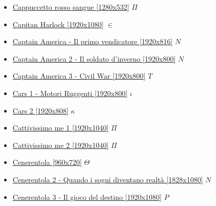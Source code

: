 		\begin{itemize}
			\item \href{https://mega.nz/#!MfB0GSza!A_4MNORyAOetdjhwdnP3vPT0Fj6Z0_Ajcos4wvka5x8} {Cappuccetto rosso sangue [1280x532]}  $\Pi$ \\
			\item \href{https://mega.nz/#!yK5jEKCJ!lJ_yQw2J7HPvvNQRLQJdn9ejVUo9O5Iq1d9aRFATL2A} {Capitan Harlock [1920x1080]}  $\in$ \\ 
			\item \href{https://mega.nz/#!pX50HYSI!QSxIGf5P5JIcTnjQvelrzRoPnqKh6_lwj1Ug7Tssxy4} {Captain America - Il primo vendicatore [1920x816]}  $N$ \\ 
			\item \href{https://mega.nz/#!FexXxCpR!CyM9i_KqW0bWrMIYrSNscP1asT5sEfMhZ57XPsyuvAQ} {Captain America 2 - Il soldato d'inverno [1920x800]}  $N$ \\ 
			\item \href{https://mega.nz/#!9rA0nLhY!wD4PwUTM_0ufZ8U8nVbi9IlPxQ-Ry5BhvoX5FOZ0N28} {Captain America 3 - Civil War [1920x800]}  $T$ \\
			\item \href{https://mega.nz/#!8pIW3Rqb!PT225xfgqJuydYxPQlm6SHMYZFbbFZndbFutCT0cQxs} {Cars 1 - Motori Ruggenti [1920x800]}  $\iota$ \\ 
			\item \href{https://mega.nz/#!rRgw2SbZ!dy9On6D7Wfza8tbfORh-WnViBZiVNF30BwRB0h4ruBc} {Cars 2 [1920x808]}  $\kappa$ \\ 
			\item \href{https://mega.nz/#!0CpjDDJa!h5t8F36ObqPbGPE8_LkagLgoigE3qJ8vL-uzbL3RlNQ} {Cattivissimo me 1 [1920x1040]}  $\Pi$ \\ 
			\item \href{https://mega.nz/#!1S4GUAyA!A8NSYQsxX0tONezYp1mC8wLdg0Z6un7tvYSaU5EH9Sc} {Cattivissimo me 2 [1920x1040]}  $\Pi$ \\ 
			\item \href{https://mega.nz/#!LlJSBaCZ!G3KddhVmr69MXkGcZPw6bqmWRa4-y1H7x841Z1tPr0A} {Cenerentola [960x720]}  $\Theta$ \\
			\item \href{https://mega.nz/#!JSYABTbR!npx_0UxCVKt95OQxc1264ErAPnFBoHPAWL2H0KQrc3c} {Cenerentola 2 - Quando i sogni diventano realtà [1828x1080]}  $N$ \\
			\item \href{https://mega.nz/#!8HgUAZqC!XqU-oYMImuBknniDkeB34mJPEYiCOvgN0oMWg9gH7kg} {Cenerentola 3 - Il gioco del destino [1920x1080]}  $P$ \\

\end{itemize}
